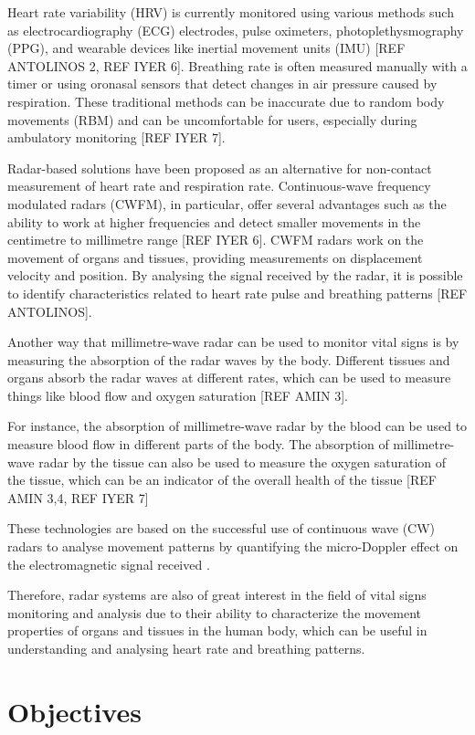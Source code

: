 	Heart rate variability (HRV) is currently monitored using various methods such as electrocardiography (ECG) electrodes, pulse oximeters, photoplethysmography (PPG), and wearable devices like inertial movement units (IMU) [REF ANTOLINOS 2, REF IYER 6]. Breathing rate is often measured manually with a timer or using oronasal sensors that detect changes in air pressure caused by respiration. These traditional methods can be inaccurate due to random body movements (RBM) and can be uncomfortable for users, especially during ambulatory monitoring [REF IYER 7].
	
	Radar-based solutions have been proposed as an alternative for non-contact measurement of heart rate and respiration rate. Continuous-wave frequency modulated radars (CWFM), in particular, offer several advantages such as the ability to work at higher frequencies and detect smaller movements in the centimetre to millimetre range [REF IYER 6]. CWFM radars work on the movement of organs and tissues, providing measurements on displacement velocity and position. By analysing the signal received by the radar, it is possible to identify characteristics related to heart rate pulse and breathing patterns [REF ANTOLINOS].
	
	Another way that millimetre-wave radar can be used to monitor vital signs is by measuring the absorption of the radar waves by the body. Different tissues and organs absorb the radar waves at different rates, which can be used to measure things like blood flow and oxygen saturation [REF AMIN 3].
	
	For instance, the absorption of millimetre-wave radar by the blood can be used to measure blood flow in different parts of the body. The absorption of millimetre-wave radar by the tissue can also be used to measure the oxygen saturation of the tissue, which can be an indicator of the overall health of the tissue [REF AMIN 3,4, REF IYER 7]
	
	These technologies are based on the successful use of continuous wave (CW) radars to analyse movement patterns by quantifying the micro-Doppler effect on the electromagnetic signal received \cite{Antolinos2020, Seifert2019}. 
	
	Therefore, radar systems are also of great interest in the field of vital signs monitoring and analysis due to their ability to characterize the movement properties of organs and tissues in the human body, which can be useful in understanding and analysing heart rate and breathing patterns.

\section{Objectives}

